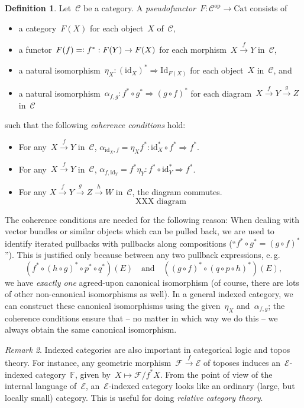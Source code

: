 \documentclass[a4paper,english,12pt]{scrartcl}
\theoremstyle{definition}
\newtheorem{defn}{Definition}[section]
\theoremstyle{plain}
\theoremstyle{remark}
\newtheorem{rem}[defn]{Remark}
\newcommand{\FF}{\mathbb{F}}
\newcommand{\C}{\mathcal{C}}
\newcommand{\E}{\mathcal{E}}
\newcommand{\F}{\mathcal{F}}
\newcommand{\id}{\mathrm{id}}
\newcommand{\op}{\mathrm{op}}
\newcommand{\xra}[1]{\xrightarrow{#1}}
\newcommand{\Cat}{\mathrm{Cat}}
\newcommand{\Id}{\mathrm{Id}}
\begin{document}
\begin{defn}Let~$\C$ be a category. A \emph{pseudofunctor}~$F : \C^\op \to
\Cat$ consists of
\begin{itemize}
\item a category~$F(X)$ for each object~$X$ of~$\C$,
\item a functor~$F(f) =\vcentcolon f^* : F(Y) \to F(X)$ for each morphism~$X \xra{f} Y$ in~$\C$,
\item a natural isomorphism~$\eta_X : (\id_X)^* \Rightarrow \Id_{F(X)}$ for each
object~$X$ in~$\C$, and
\item a natural isomorphism~$\alpha_{f,g} : f^* \circ g^* \Rightarrow (g \circ
f)^*$ for each diagram~$X \xra{f} Y \xra{g} Z$ in~$\C$
\end{itemize}
such that the following \emph{coherence conditions} hold:
\begin{itemize}
\item For any~$X \xra{f} Y$ in~$\C$, $\alpha_{\id_X,f} = \eta_X f^* : \id_X^* \circ f^*
\Rightarrow f^*$.
\item For any~$X \xra{f} Y$ in~$\C$, $\alpha_{f,\id_Y} = f^* \eta_Y : f^* \circ
\id_Y^* \Rightarrow f^*$.
\item For any $X \xra{f} Y \xra{g} Z \xra{h} W$ in~$\C$, the diagram commutes.
\[ \text{XXX diagram} \]
\end{itemize}
\end{defn}

The coherence conditions are needed for the following reason:
When dealing with vector bundles or similar objects which can be pulled back,
we are used to identify iterated pullbacks with pullbacks along compositions
(``$f^* \circ g^* = (g \circ f)^*$'').
This is justified only because between any
two pullback expressions, e.\,g.\@
\[ (f^* \circ (h \circ g)^* \circ p^* \circ q^*)(E) \quad\text{and}\quad
  ((g \circ f)^* \circ (q \circ p \circ h)^*)(E), \]
we have \emph{exactly one} agreed-upon canonical isomorphism (of course, there
are lots of other non-canonical isomorphisms as well). In a general indexed
category, we can construct these canonical isomorphisms using the
given~$\eta_X$ and~$\alpha_{f,g}$; the coherence conditions ensure that -- no
matter in which way we do this -- we always obtain the same canonical
isomorphism.

\begin{rem}Indexed categories are also important in categorical logic and topos
theory. For instance, any geometric morphism~$\F \xra{f} \E$ of toposes induces
an~$\E$-indexed category~$\FF$, given by~$X \mapsto \F/f^*X$. From the point of
view of the internal language of~$\E$, an~$\E$-indexed category looks like an
ordinary (large, but locally small) category. This is useful for doing \emph{relative category theory}.
\end{rem}
\end{document}
